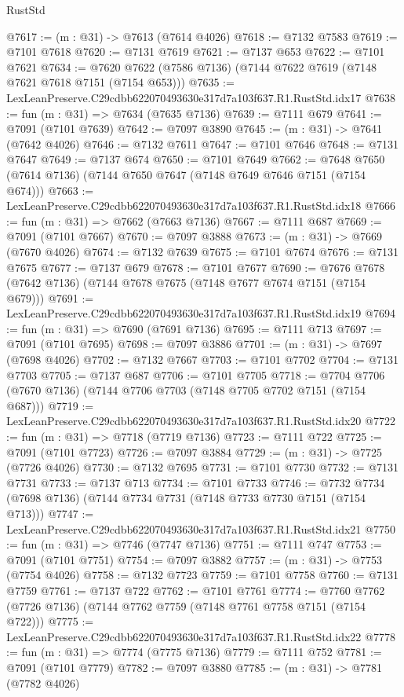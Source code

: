 \begin{lexlean}{RustStd}
\begin{coremodule}
@7617 := (m : @31) -> @7613 (@7614 @4026)
@7618 := @7132 @7583
@7619 := @7101 @7618
@7620 := @7131 @7619
@7621 := @7137 @653
@7622 := @7101 @7621
@7634 := @7620 @7622 (@7586 @7136) (@7144 @7622 @7619 (@7148 @7621 @7618 @7151 (@7154 @653)))
@7635 := LexLeanPreserve.C29cdbb622070493630e317d7a103f637.R1.RustStd.idx17
@7638 := fun (m : @31) => @7634 (@7635 @7136)
@7639 := @7111 @679
@7641 := @7091 (@7101 @7639)
@7642 := @7097 @3890
@7645 := (m : @31) -> @7641 (@7642 @4026)
@7646 := @7132 @7611
@7647 := @7101 @7646
@7648 := @7131 @7647
@7649 := @7137 @674
@7650 := @7101 @7649
@7662 := @7648 @7650 (@7614 @7136) (@7144 @7650 @7647 (@7148 @7649 @7646 @7151 (@7154 @674)))
@7663 := LexLeanPreserve.C29cdbb622070493630e317d7a103f637.R1.RustStd.idx18
@7666 := fun (m : @31) => @7662 (@7663 @7136)
@7667 := @7111 @687
@7669 := @7091 (@7101 @7667)
@7670 := @7097 @3888
@7673 := (m : @31) -> @7669 (@7670 @4026)
@7674 := @7132 @7639
@7675 := @7101 @7674
@7676 := @7131 @7675
@7677 := @7137 @679
@7678 := @7101 @7677
@7690 := @7676 @7678 (@7642 @7136) (@7144 @7678 @7675 (@7148 @7677 @7674 @7151 (@7154 @679)))
@7691 := LexLeanPreserve.C29cdbb622070493630e317d7a103f637.R1.RustStd.idx19
@7694 := fun (m : @31) => @7690 (@7691 @7136)
@7695 := @7111 @713
@7697 := @7091 (@7101 @7695)
@7698 := @7097 @3886
@7701 := (m : @31) -> @7697 (@7698 @4026)
@7702 := @7132 @7667
@7703 := @7101 @7702
@7704 := @7131 @7703
@7705 := @7137 @687
@7706 := @7101 @7705
@7718 := @7704 @7706 (@7670 @7136) (@7144 @7706 @7703 (@7148 @7705 @7702 @7151 (@7154 @687)))
@7719 := LexLeanPreserve.C29cdbb622070493630e317d7a103f637.R1.RustStd.idx20
@7722 := fun (m : @31) => @7718 (@7719 @7136)
@7723 := @7111 @722
@7725 := @7091 (@7101 @7723)
@7726 := @7097 @3884
@7729 := (m : @31) -> @7725 (@7726 @4026)
@7730 := @7132 @7695
@7731 := @7101 @7730
@7732 := @7131 @7731
@7733 := @7137 @713
@7734 := @7101 @7733
@7746 := @7732 @7734 (@7698 @7136) (@7144 @7734 @7731 (@7148 @7733 @7730 @7151 (@7154 @713)))
@7747 := LexLeanPreserve.C29cdbb622070493630e317d7a103f637.R1.RustStd.idx21
@7750 := fun (m : @31) => @7746 (@7747 @7136)
@7751 := @7111 @747
@7753 := @7091 (@7101 @7751)
@7754 := @7097 @3882
@7757 := (m : @31) -> @7753 (@7754 @4026)
@7758 := @7132 @7723
@7759 := @7101 @7758
@7760 := @7131 @7759
@7761 := @7137 @722
@7762 := @7101 @7761
@7774 := @7760 @7762 (@7726 @7136) (@7144 @7762 @7759 (@7148 @7761 @7758 @7151 (@7154 @722)))
@7775 := LexLeanPreserve.C29cdbb622070493630e317d7a103f637.R1.RustStd.idx22
@7778 := fun (m : @31) => @7774 (@7775 @7136)
@7779 := @7111 @752
@7781 := @7091 (@7101 @7779)
@7782 := @7097 @3880
@7785 := (m : @31) -> @7781 (@7782 @4026)

\end{coremodule}
\end{lexlean}
